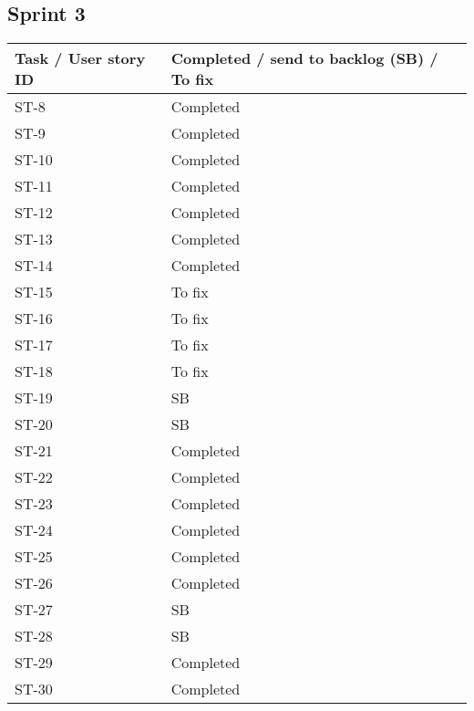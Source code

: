 \documentclass[12pt]{article}
\begin{document}
\subsection{Sprint 3}
{
\centering
\begin{longtable}{| p{7cm} | p{7cm}|}
			\hline			
			\textbf{Task / User story ID} & \textbf{Completed / send to backlog (SB) / To fix }
			 \\ \hline  ST-8 & Completed \\ \hline
             \hline  ST-9 & Completed \\ \hline
             \hline  ST-10 & Completed \\ \hline
             \hline  ST-11 & Completed \\ \hline
             \hline  ST-12 & Completed \\ \hline
             \hline  ST-13 & Completed \\ \hline
             \hline  ST-14 & Completed \\ \hline
             \hline  ST-15 & To fix \\ \hline
             \hline  ST-16 & To fix \\ \hline 
             \hline  ST-17 & To fix \\ \hline
             \hline  ST-18 & To fix \\ \hline
             \hline  ST-19 & SB \\ \hline
             \hline  ST-20 & SB \\ \hline
             \hline  ST-21 & Completed \\ \hline
             \hline  ST-22 & Completed \\ \hline
             \hline  ST-23 & Completed \\ \hline
             \hline  ST-24 & Completed \\ \hline
             \hline  ST-25 & Completed \\ \hline
             \hline  ST-26 & Completed \\ \hline
             \hline  ST-27 & SB \\ \hline
             \hline  ST-28 & SB \\ \hline
             \hline  ST-29 & Completed \\ \hline
             \hline  ST-30 & Completed \\ \hline
\end{longtable}
}
\end{document}
